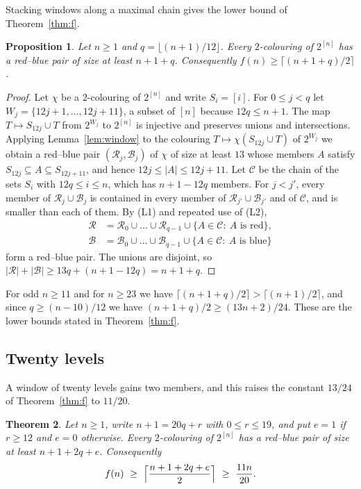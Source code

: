 \documentclass[11pt,reqno]{amsart}
\numberwithin{equation}{section}
\theoremstyle{plain}
\newtheorem{theorem}{Theorem}[section]
\newtheorem{proposition}[theorem]{Proposition}
\theoremstyle{definition}
\theoremstyle{remark}
\newcommand{\cB}{\mathcal{B}}
\newcommand{\cC}{\mathcal{C}}
\newcommand{\cR}{\mathcal{R}}
\begin{document}
Stacking windows along a maximal chain gives the lower bound of
Theorem~\ref{thm:f}.

\begin{proposition}
\label{prop:flower}
Let $n\ge1$ and $q=\lfloor(n+1)/12\rfloor$. Every $2$-colouring of
$2^{[n]}$ has a red--blue pair of size at least $n+1+q$. Consequently
$f(n)\ge\lceil(n+1+q)/2\rceil$.
\end{proposition}

\begin{proof}
Let $\chi$ be a $2$-colouring of $2^{[n]}$ and write $S_i=[i]$. For
$0\le j<q$ let $W_j=\{12j+1,\dots,12j+11\}$, a subset of $[n]$ because
$12q\le n+1$. The map $T\mapsto S_{12j}\cup T$ from $2^{W_j}$ to $2^{[n]}$
is injective and preserves unions and intersections. Applying
Lemma~\ref{lem:window} to the colouring $T\mapsto\chi(S_{12j}\cup T)$ of
$2^{W_j}$ we obtain a red--blue pair $(\cR_j,\cB_j)$ of $\chi$ of size at
least $13$ whose members $A$ satisfy $S_{12j}\subseteq A\subseteq
S_{12j+11}$, and hence $12j\le|A|\le12j+11$. Let $\cC$ be the chain of the
sets $S_i$ with $12q\le i\le n$, which has $n+1-12q$ members. For $j<j'$,
every member of $\cR_j\cup\cB_j$ is contained in every member of
$\cR_{j'}\cup\cB_{j'}$ and of $\cC$, and is smaller than each of them. By
(L1) and repeated use of (L2),
\begin{align*}
\cR&=\cR_0\cup\dots\cup\cR_{q-1}\cup\{A\in\cC:\ A\text{ is red}\},\\
\cB&=\cB_0\cup\dots\cup\cB_{q-1}\cup\{A\in\cC:\ A\text{ is blue}\}
\end{align*}
form a red--blue pair. The unions are disjoint, so
$|\cR|+|\cB|\ge13q+(n+1-12q)=n+1+q$.
\end{proof}

For odd $n\ge11$ and for $n\ge23$ we have $\lceil(n+1+q)/2\rceil>
\lceil(n+1)/2\rceil$, and since $q\ge(n-10)/12$ we have
$(n+1+q)/2\ge(13n+2)/24$. These are the lower bounds stated in
Theorem~\ref{thm:f}.

\subsection{Twenty levels}

A window of twenty levels gains two members, and this raises the constant
$13/24$ of Theorem~\ref{thm:f} to $11/20$.

\begin{theorem}
\label{thm:f20}
Let $n\ge1$, write $n+1=20q+r$ with $0\le r\le19$, and put $e=1$ if
$r\ge12$ and $e=0$ otherwise. Every $2$-colouring of $2^{[n]}$ has a
red--blue pair of size at least $n+1+2q+e$. Consequently
\[
f(n)\ \ge\ \Bigl\lceil\frac{n+1+2q+e}{2}\Bigr\rceil\ \ge\ \frac{11n}{20}.
\]
\end{theorem}
\end{document}
